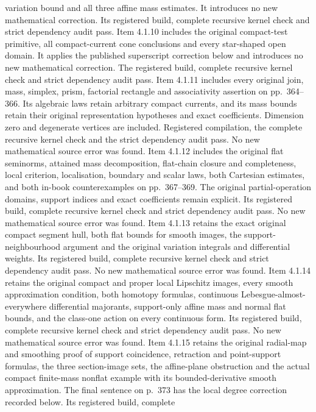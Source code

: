 \documentclass[11pt]{article}
\begin{document}
\begin{itemize}
variation bound and all three affine mass estimates. It introduces no new
mathematical correction. Its registered build, complete recursive kernel
check and strict dependency audit pass.
Item 4.1.10 includes the original compact-test primitive, all compact-current
cone conclusions and every star-shaped open domain. It applies the published
superscript correction below and introduces no new mathematical correction.
The registered build, complete recursive kernel check and strict dependency
audit pass. Item 4.1.11 includes every original join, mass, simplex, prism, factorial
rectangle and associativity assertion on pp.~364--366. Its algebraic laws
retain arbitrary compact currents, and its mass bounds retain their
original representation hypotheses and exact coefficients. Dimension zero
and degenerate vertices are included. Registered compilation, the complete
recursive kernel check and the strict dependency audit pass. No new
mathematical source error was found. Item 4.1.12 includes the original
flat seminorms, attained mass decomposition, flat-chain closure and
completeness, local criterion, localisation, boundary and scalar laws,
both Cartesian estimates, and both in-book counterexamples on
pp.~367--369. The original partial-operation domains, support indices and
exact coefficients remain explicit. Its registered build, complete
recursive kernel check and strict dependency audit pass. No new
mathematical source error was found. Item 4.1.13 retains the exact
original compact segment hull, both flat bounds for smooth images,
the support-neighbourhood argument and the original variation integrals
and differential weights. Its registered build, complete recursive kernel
check and strict dependency audit pass. No new mathematical source error
was found. Item 4.1.14 retains the original compact and proper local
Lipschitz images, every smooth approximation condition, both homotopy
formulas, continuous Lebesgue-almost-everywhere differential majorants,
support-only affine mass and normal flat bounds, and the class-one action
on every continuous form. Its registered build, complete recursive kernel
check and strict dependency audit pass. No new mathematical source error
was found. Item 4.1.15 retains the original radial-map and smoothing
proof of support coincidence, retraction and point-support formulas,
the three section-image sets, the affine-plane obstruction and the
actual compact finite-mass nonflat example with its bounded-derivative
smooth approximation. The final sentence on p.~373 has the local
degree correction recorded below. Its registered build, complete

\end{itemize}
\end{document}
